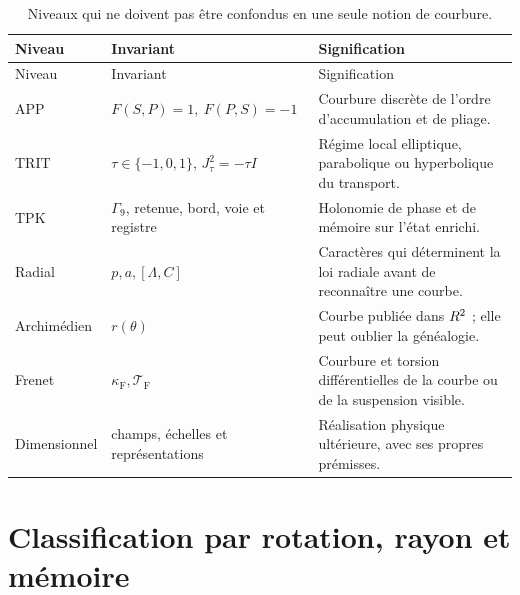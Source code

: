 \begin{longtable}{p{}p{}p{}}
\caption{Niveaux qui ne doivent pas être confondus en une seule notion de courbure.}
\label{espiral:tab:niveles-curvatura}\\
\toprule
Niveau&Invariant&Signification\\
\midrule
\endfirsthead
\toprule
Niveau&Invariant&Signification\\
\midrule
\endhead
APP&\(F(S,P)=1,\ F(P,S)=-1\)&Courbure discrète de l'ordre d'accumulation et de pliage.\\
TRIT&\(\tau\in\{-1,0,1\}\), \(J_\tau^2=-\tau I\)&Régime local elliptique, parabolique ou hyperbolique du transport.\\
TPK&\(\Gamma_9\), retenue, bord, voie et registre&Holonomie de phase et de mémoire sur l'état enrichi.\\
Radial&\(p,a,[\Lambda,C]\)&Caractères qui déterminent la loi radiale avant de reconnaître une courbe.\\
Archimédien&\(r(\theta)\)&Courbe publiée dans \(R^2\) ; elle peut oublier la généalogie.\\
Frenet&\(\kappa_{\mathrm{F}},\mathcal T_{\mathrm{F}}\)&Courbure et torsion différentielles de la courbe ou de la suspension visible.\\
Dimensionnel&champs, échelles et représentations&Réalisation physique ultérieure, avec ses propres prémisses.\\
\bottomrule
\end{longtable}

\section{Classification par rotation, rayon et mémoire}

